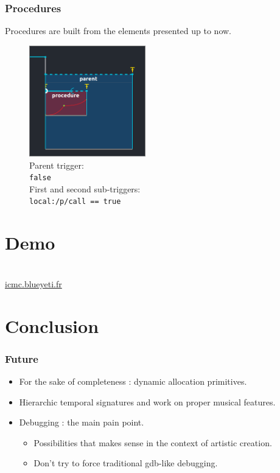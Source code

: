 \documentclass{beamer}
\begin{document}
\begin{frame}
    \frametitle{Procedures}
    Procedures are built from the elements presented up to now.
    
    \begin{figure}
        \includegraphics[width=0.45\textwidth]{images/procedure.png}
        \caption{Parent trigger:~\\\texttt{false}~\\First and second sub-triggers:~\\\texttt{local:/p/call == true}}
    \end{figure}
\end{frame}

\section{Demo}

\begin{frame}
    \Huge
    ~\\\vspace{1cm}
    \url{icmc.blueyeti.fr}
\end{frame}

\section{Conclusion}
\begin{frame}
	\frametitle{Future} 
	\Large
	\begin{itemize}
        \item<1> For the sake of completeness : dynamic allocation primitives.
        \item<2> Hierarchic temporal signatures and work on proper musical features.
        \item<3> Debugging : the main pain point.
        \begin{itemize}
            \item Possibilities that makes sense in the context of artistic creation.
            \item Don't try to force traditional gdb-like debugging.
        \end{itemize}
		
	\end{itemize}
\end{frame}    
\end{document}
